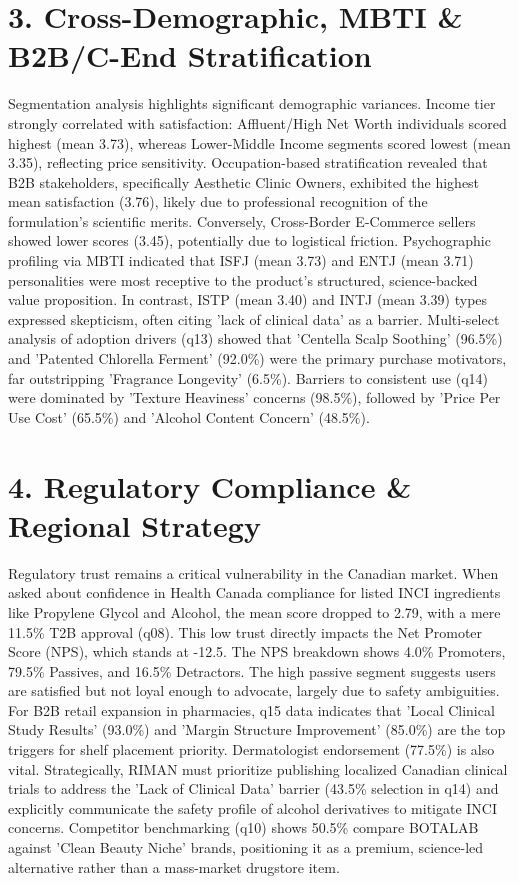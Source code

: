\documentclass[10pt,twocolumn,a4paper]{article}
\begin{document}
\section{3. Cross-Demographic, MBTI \& B2B/C-End Stratification}
Segmentation analysis highlights significant demographic variances. Income tier strongly correlated with satisfaction: Affluent/High Net Worth individuals scored highest (mean 3.73), whereas Lower-Middle Income segments scored lowest (mean 3.35), reflecting price sensitivity. Occupation-based stratification revealed that B2B stakeholders, specifically Aesthetic Clinic Owners, exhibited the highest mean satisfaction (3.76), likely due to professional recognition of the formulation's scientific merits. Conversely, Cross-Border E-Commerce sellers showed lower scores (3.45), potentially due to logistical friction. Psychographic profiling via MBTI indicated that ISFJ (mean 3.73) and ENTJ (mean 3.71) personalities were most receptive to the product's structured, science-backed value proposition. In contrast, ISTP (mean 3.40) and INTJ (mean 3.39) types expressed skepticism, often citing 'lack of clinical data' as a barrier. Multi-select analysis of adoption drivers (q13) showed that 'Centella Scalp Soothing' (96.5\%) and 'Patented Chlorella Ferment' (92.0\%) were the primary purchase motivators, far outstripping 'Fragrance Longevity' (6.5\%). Barriers to consistent use (q14) were dominated by 'Texture Heaviness' concerns (98.5\%), followed by 'Price Per Use Cost' (65.5\%) and 'Alcohol Content Concern' (48.5\%).
\section{4. Regulatory Compliance \& Regional Strategy}
Regulatory trust remains a critical vulnerability in the Canadian market. When asked about confidence in Health Canada compliance for listed INCI ingredients like Propylene Glycol and Alcohol, the mean score dropped to 2.79, with a mere 11.5\% T2B approval (q08). This low trust directly impacts the Net Promoter Score (NPS), which stands at -12.5. The NPS breakdown shows 4.0\% Promoters, 79.5\% Passives, and 16.5\% Detractors. The high passive segment suggests users are satisfied but not loyal enough to advocate, largely due to safety ambiguities. For B2B retail expansion in pharmacies, q15 data indicates that 'Local Clinical Study Results' (93.0\%) and 'Margin Structure Improvement' (85.0\%) are the top triggers for shelf placement priority. Dermatologist endorsement (77.5\%) is also vital. Strategically, RIMAN must prioritize publishing localized Canadian clinical trials to address the 'Lack of Clinical Data' barrier (43.5\% selection in q14) and explicitly communicate the safety profile of alcohol derivatives to mitigate INCI concerns. Competitor benchmarking (q10) shows 50.5\% compare BOTALAB against 'Clean Beauty Niche' brands, positioning it as a premium, science-led alternative rather than a mass-market drugstore item.
\end{document}
